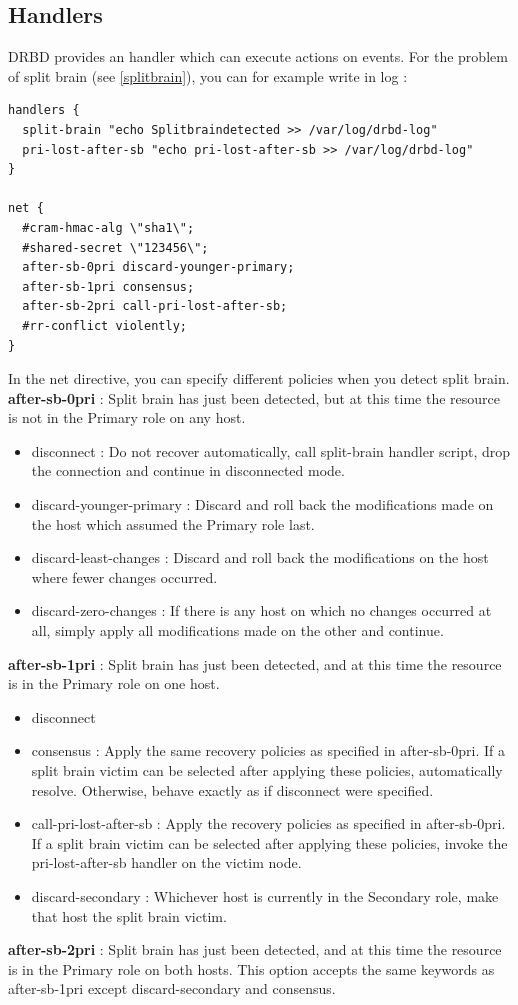\documentclass[a4paper,10pt]{report}
\begin{document}
\subsection{Handlers}
DRBD provides an handler which can execute actions on events. For the problem of split brain (see \ref{splitbrain}), you can for example write in log :
\begin{lstlisting}
handlers {
  split-brain "echo Splitbraindetected >> /var/log/drbd-log"
  pri-lost-after-sb "echo pri-lost-after-sb >> /var/log/drbd-log"
}

net {
  #cram-hmac-alg \"sha1\";
  #shared-secret \"123456\";
  after-sb-0pri discard-younger-primary;
  after-sb-1pri consensus;
  after-sb-2pri call-pri-lost-after-sb;
  #rr-conflict violently;
}
\end{lstlisting}
In the net directive, you can specify different policies when you detect split brain.\\
\textbf{after-sb-0pri} : Split brain has just been detected, but at this time the resource is not in the Primary role on any host.
\begin{itemize}
\item disconnect : Do not recover automatically, call split-brain handler script, drop the connection and continue in disconnected mode.
\item discard-younger-primary : Discard and roll back the modifications made on the host which assumed the Primary role last.
\item discard-least-changes : Discard and roll back the modifications on the host where fewer changes occurred.
\item discard-zero-changes : If there is any host on which no changes occurred at all, simply apply all modifications made on the other and continue.
\end{itemize}
\textbf{after-sb-1pri} : Split brain has just been detected, and at this time the resource is in the Primary role on one host.
\begin{itemize}
\item disconnect 
\item consensus : Apply the same recovery policies as specified in after-sb-0pri. If a split brain victim can be selected after applying these policies, automatically resolve. Otherwise, behave exactly as if disconnect were specified.
\item call-pri-lost-after-sb : Apply the recovery policies as specified in after-sb-0pri. If a split brain victim can be selected after applying these policies, invoke the pri-lost-after-sb handler on the victim node.
\item discard-secondary : Whichever host is currently in the Secondary role, make that host the split brain victim.
\end{itemize}
\textbf{after-sb-2pri} : Split brain has just been detected, and at this time the resource is in the Primary role on both hosts. This option accepts the same keywords as after-sb-1pri except discard-secondary and consensus.
\end{document}
